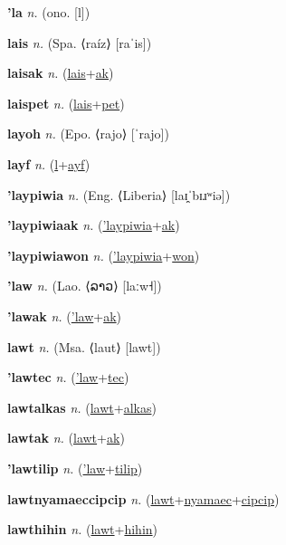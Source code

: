 \textbf{\hypertarget{'la}{'la}} \textit{n.} (ono. [l])


\textbf{\hypertarget{lais}{lais}} \textit{n.} (Spa. ⟨raíz⟩ [raˈis])


\textbf{\hypertarget{laisak}{laisak}} \textit{n.} (\hyperlink{lais}{lais}+\allowbreak \hyperlink{ak}{ak})


\textbf{\hypertarget{laispet}{laispet}} \textit{n.} (\hyperlink{lais}{lais}+\allowbreak \hyperlink{pet}{pet})


\textbf{\hypertarget{layoh}{layoh}} \textit{n.} (Epo. ⟨rajo⟩ [ˈrajo])


\textbf{\hypertarget{layf}{layf}} \textit{n.} (\hyperlink{l}{l}+\allowbreak \hyperlink{ayf}{ayf})


\textbf{\hypertarget{'laypiwia}{'laypiwia}} \textit{n.} (Eng. ⟨Liberia⟩ [laɪ̯ˈbɪɹʷiə])


\textbf{\hypertarget{'laypiwiaak}{'laypiwiaak}} \textit{n.} (\hyperlink{'laypiwia}{'laypiwia}+\allowbreak \hyperlink{ak}{ak})


\textbf{\hypertarget{'laypiwiawon}{'laypiwiawon}} \textit{n.} (\hyperlink{'laypiwia}{'laypiwia}+\allowbreak \hyperlink{won}{won})


\textbf{\hypertarget{'law}{'law}} \textit{n.} (Lao. ⟨{\lao{}ລາວ}⟩ [laːw˧])


\textbf{\hypertarget{'lawak}{'lawak}} \textit{n.} (\hyperlink{'law}{'law}+\allowbreak \hyperlink{ak}{ak})


\textbf{\hypertarget{lawt}{lawt}} \textit{n.} (Msa. ⟨laut⟩ [lawt])


\textbf{\hypertarget{'lawtec}{'lawtec}} \textit{n.} (\hyperlink{'law}{'law}+\allowbreak \hyperlink{tec}{tec})


\textbf{\hypertarget{lawtalkas}{lawtalkas}} \textit{n.} (\hyperlink{lawt}{lawt}+\allowbreak \hyperlink{alkas}{alkas})


\textbf{\hypertarget{lawtak}{lawtak}} \textit{n.} (\hyperlink{lawt}{lawt}+\allowbreak \hyperlink{ak}{ak})


\textbf{\hypertarget{'lawtilip}{'lawtilip}} \textit{n.} (\hyperlink{'law}{'law}+\allowbreak \hyperlink{tilip}{tilip})


\textbf{\hypertarget{lawtnyamaeccipcip}{lawtnyamaeccipcip}} \textit{n.} (\hyperlink{lawt}{lawt}+\allowbreak \hyperlink{nyamaec}{nyamaec}+\allowbreak \hyperlink{cipcip}{cipcip})


\textbf{\hypertarget{lawthihin}{lawthihin}} \textit{n.} (\hyperlink{lawt}{lawt}+\allowbreak \hyperlink{hihin}{hihin})


